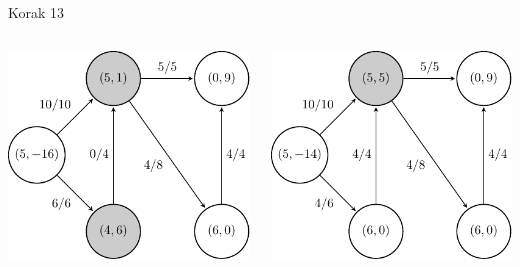 \documentclass{beamer}
\begin{document}
\begin{frame}{Korak 13}
    \begin{columns}
        \begin{column}{0.5\textwidth}
            \centering
            \includegraphics[scale=0.7]{../writing/images/graf2-14.pdf}
        \end{column}
        \pause
        \begin{column}{0.5\textwidth}
            \centering
            \includegraphics[scale=0.7]{../writing/images/graf2-15.pdf}
        \end{column}
    \end{columns}
\end{frame}
\end{document}
